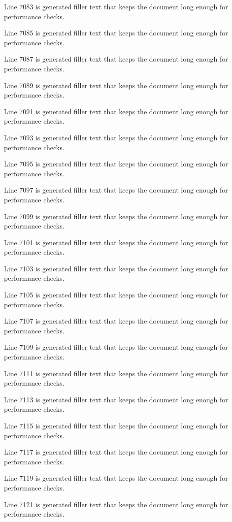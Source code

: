 Line 7083 is generated filler text that keeps the document long enough for performance checks.

Line 7085 is generated filler text that keeps the document long enough for performance checks.

Line 7087 is generated filler text that keeps the document long enough for performance checks.

Line 7089 is generated filler text that keeps the document long enough for performance checks.

Line 7091 is generated filler text that keeps the document long enough for performance checks.

Line 7093 is generated filler text that keeps the document long enough for performance checks.

Line 7095 is generated filler text that keeps the document long enough for performance checks.

Line 7097 is generated filler text that keeps the document long enough for performance checks.

Line 7099 is generated filler text that keeps the document long enough for performance checks.

Line 7101 is generated filler text that keeps the document long enough for performance checks.

Line 7103 is generated filler text that keeps the document long enough for performance checks.

Line 7105 is generated filler text that keeps the document long enough for performance checks.

Line 7107 is generated filler text that keeps the document long enough for performance checks.

Line 7109 is generated filler text that keeps the document long enough for performance checks.

Line 7111 is generated filler text that keeps the document long enough for performance checks.

Line 7113 is generated filler text that keeps the document long enough for performance checks.

Line 7115 is generated filler text that keeps the document long enough for performance checks.

Line 7117 is generated filler text that keeps the document long enough for performance checks.

Line 7119 is generated filler text that keeps the document long enough for performance checks.

Line 7121 is generated filler text that keeps the document long enough for performance checks.

